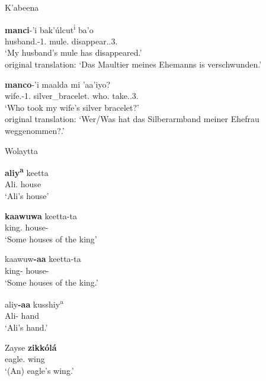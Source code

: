 \begin{exe}\ex\label{KabGen} {K'abeena} \citep[Eastern Cushitic; Ethiopia; ][115]{Crass:2005}\nopagebreak 
\begin{xlist} 
\ex\gll \textbf{manci}-'i bak'\'ulcut\textsuperscript{i} ba'o\\
husband.\gen{}-1\sg{}.\poss{} mule.\nom{} disappear.\pfv{}.3\sg{}.\fem{}\\
`My husband's mule has disappeared.'\\
original translation: `Das Maultier meines Ehemanns is verschwunden.'

\ex\gll \textbf{manco}-'i maalda mi 'aa'iyo?\\
wife.\gen{}-1\sg{}.\poss{} silver\_bracelet.\acc{} who.\nom{} take.\pfv{}.3\sg{}.\mas{}\\
`Who took my wife's silver bracelet?'\\
original translation: `Wer/Was hat das Silberarmband meiner Ehefrau weggenommen?.'
\end{xlist}
\end{exe}  


\begin{exe}\ex\label{WolGen} {Wolaytta} \citep[Omotic; Ethiopia; ][217, 218]{Lamberti:1997}\nopagebreak[4]
\begin{xlist}
\ex\gll \textbf{aliy\textsuperscript{a}} keetta\\
Ali.\gen{} house\\
`Ali's house'

\ex\gll \textbf{kaawuwa} keetta-ta\\
king.\gen{} house-\pl{}\\
`Some houses of the king'

\ex\gll kaawuw\textbf{-aa} keetta-ta\\
king-\gen{} house-\pl{}\\
`Some houses of the king.'

\ex\gll aliy\textbf{-aa} kusshiy\textsuperscript{a}\\
Ali-\gen{} hand\\
`Ali's hand.'
\end{xlist}
\end{exe}

\enlargethispage{2\baselineskip}
\begin{exe} \ex\label{ZayGen} {Zayse} \citep[Omotic; Ethiopia; ][251]{Hayward:1990}\nopagebreak
\gll \textbf{zikk\'ol\'a} \\
eagle.\gen{} wing\\
`(An) eagle's wing.'
\end{exe}

